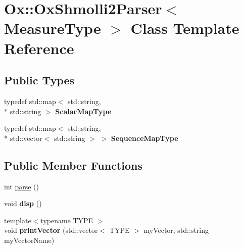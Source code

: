 \hypertarget{class_ox_1_1_ox_shmolli2_parser}{\section{Ox\-:\-:Ox\-Shmolli2\-Parser$<$ Measure\-Type $>$ Class Template Reference}
\label{class_ox_1_1_ox_shmolli2_parser}
}
\subsection*{Public Types}
\begin{DoxyCompactItemize}
\item 
\hypertarget{class_ox_1_1_ox_shmolli2_parser_a070c398a392fefb9d187b0d266f31f29}{typedef std\-::map$<$ std\-::string, \\*
std\-::string $>$ {\bfseries Scalar\-Map\-Type}}\label{class_ox_1_1_ox_shmolli2_parser_a070c398a392fefb9d187b0d266f31f29}

\item 
\hypertarget{class_ox_1_1_ox_shmolli2_parser_ae2b841d1276e17f9aa700bae8dd6f19a}{typedef std\-::map$<$ std\-::string, \\*
std\-::vector$<$ std\-::string $>$ $>$ {\bfseries Sequence\-Map\-Type}}\label{class_ox_1_1_ox_shmolli2_parser_ae2b841d1276e17f9aa700bae8dd6f19a}

\end{DoxyCompactItemize}
\subsection*{Public Member Functions}
\begin{DoxyCompactItemize}
\item 
int \hyperlink{class_ox_1_1_ox_shmolli2_parser_af3bd91660c1c5d887aefd5a024355c39}{parse} ()
\item 
\hypertarget{class_ox_1_1_ox_shmolli2_parser_ac429ecf76d78eb26154a337e899066f8}{void {\bfseries disp} ()}\label{class_ox_1_1_ox_shmolli2_parser_ac429ecf76d78eb26154a337e899066f8}

\item 
\hypertarget{class_ox_1_1_ox_shmolli2_parser_ac05be8869e359281b5f3c1513afc1b1b}{{\footnotesize template$<$typename T\-Y\-P\-E $>$ }\\void {\bfseries print\-Vector} (std\-::vector$<$ T\-Y\-P\-E $>$ my\-Vector, std\-::string my\-Vector\-Name)}\label{class_ox_1_1_ox_shmolli2_parser_ac05be8869e359281b5f3c1513afc1b1b}

\end{DoxyCompactItemize}
